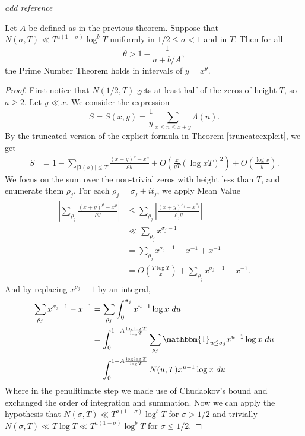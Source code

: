 \textit{add reference}
\begin{theorem}[Hoheisel] \label{Hoheisel}
    Let $A$ be defined as in the previous theorem.
    Suppose that $N(\sigma, T)\ll T^{a(1-\sigma)}\log^b T$ uniformly in $1/2\leq\sigma<1$ and in $T$. Then for all \[
        \theta > 1 - \frac{1}{a+b/A},
    \] the Prime Number Theorem holds in 
    intervals of $y=x^\theta$.
\end{theorem}
\begin{proof}
    First notice that $N(1/2,T)$ gets at least half of the zeros of height $T$, so $a\geq 2$.
    Let $y\ll x$. 
    We consider the expression \[
        S=S(x,y)=\frac{1}{y}\sum_{x\leq n \leq x+y} \Lambda(n).
    \]
    By the truncated version of the explicit formula in Theorem \ref{truncateexplcit}, we get
    \begin{align*}
        S &= 1 - \sum_{|\Im{(\rho)}|\leq T} \frac{(x+y)^\rho-x^\rho}{\rho y} + O(\frac{x}{yT}(\log xT) ^2) + O(\frac{\log x}{y}) . 
    \end{align*} 
    We focus on the sum over the non-trivial zeros with height less than $T$, and enumerate them $\rho_j$. For each $\rho_j=\sigma_j+it_j$, we apply Mean Value
    \begin{align*}
        \left|\sum_{\rho_j} \frac{(x+y)^\rho-x^\rho}{\rho y}\right|&\leq \sum_{\rho_j}\left|\frac{(x+y)^{\rho_j}-x^{\rho_j}}{\rho_j y}\right|\\
        &\ll \sum_{\rho_j} x^{\sigma_j-1}\\
        &= \sum_{\rho_j} x^{\sigma_j-1} - x^{-1} + x^{-1}\\
        &= O\left(\frac{T\log T}{x}\right) + \sum_{\rho_j} x^{\sigma_j-1} - x^{-1}.
    \end{align*}
    And by replacing $x^{\sigma_j}-1$ by an integral,\begin{align*}
        \sum_{\rho_j} x^{\sigma_j-1} - x^{-1} &=\sum_{\rho_j} \int_0^{\sigma_j}  x^{u-1} \log x \ du \\ 
        &=  \int_0^{1-A\frac{\log \log T}{\log T}} \sum_{\rho_j} \mathbbm{1}_{u\leq \sigma_j}x^{u-1} \log x \ du\\
        &= \int_0^{1-A\frac{\log \log T}{\log T}} N(u,T) x^{u-1} \log x \ du
    \end{align*}
    Where in the penulitimate step we made use of Chudaokov's bound and exchanged the order of integration and summation.
    Now we can apply the hypothesis that $N(\sigma, T)\ll T^{a(1-\sigma)}\log^b T$ for $\sigma>1/2$ and trivially $N(\sigma, T)\ll T \log T \ll T^{a(1-\sigma)}\log^b T$ for $\sigma \leq 1/2$.

\end{proof}
